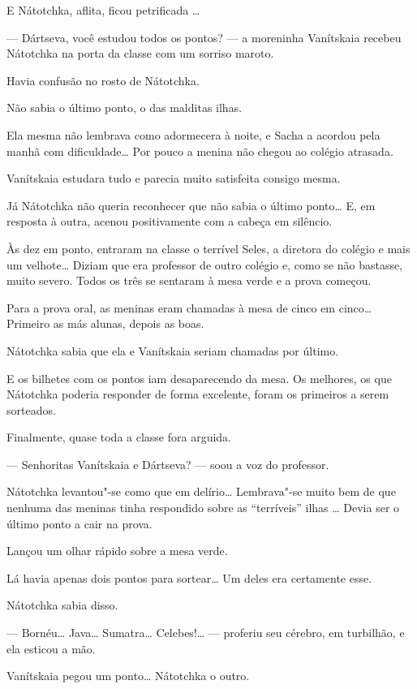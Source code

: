 E Nátotchka, aflita, ficou petrificada \ldots{}

\asterisc

--- Dártseva, você estudou todos os pontos? --- a moreninha Vanítskaia
recebeu Nátotchka na porta da classe com um sorriso maroto.

Havia confusão no rosto de Nátotchka.

Não sabia o último ponto, o das malditas ilhas.

Ela mesma não lembrava como adormecera à noite, e Sacha a acordou pela
manhã com dificuldade\ldots{} Por pouco a menina não chegou ao colégio
atrasada.

Vanítskaia estudara tudo e parecia muito satisfeita consigo mesma.

Já Nátotchka não queria reconhecer que não sabia o último ponto\ldots{} E, em
resposta à outra, acenou positivamente com a cabeça em silêncio.

Às dez em ponto, entraram na classe o terrível Seles, a diretora do
colégio e mais um velhote\ldots{} Diziam que era professor de outro colégio
e, como se não bastasse, muito severo. Todos os três se sentaram à mesa
verde e a prova começou.

Para a prova oral, as meninas eram chamadas à mesa de cinco em cinco\ldots{}
Primeiro as más alunas, depois as boas.

Nátotchka sabia que ela e Vanítskaia seriam chamadas por último.

E os bilhetes com os pontos iam desaparecendo da mesa. Os melhores, os
que Nátotchka poderia responder de forma excelente, foram os primeiros a
serem sorteados.

Finalmente, quase toda a classe fora arguida.

--- Senhoritas Vanítskaia e Dártseva? --- soou a voz do professor.

Nátotchka levantou"-se como que em delírio\ldots{} Lembrava"-se muito bem de
que nenhuma das meninas tinha respondido sobre as ``terríveis'' ilhas
\ldots{} Devia ser o último ponto a cair na prova.

Lançou um olhar rápido sobre a mesa verde.

Lá havia apenas dois pontos para sortear\ldots{} Um deles era certamente
esse.

Nátotchka sabia disso.

--- Bornéu\ldots{} Java\ldots{} Sumatra\ldots{} Celebes!\ldots{} --- proferiu seu cérebro,
em turbilhão, e ela esticou a mão.

Vanítskaia pegou um ponto\ldots{} Nátotchka o outro.

